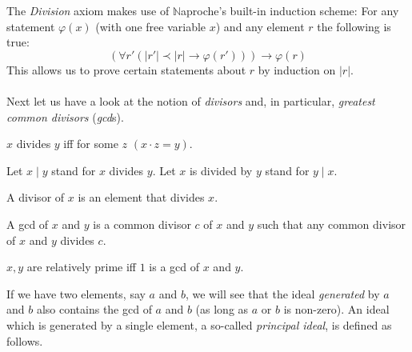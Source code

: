 \documentclass{article}
\begin{document}
  The \textit{Division} axiom makes use of {$\mathbb{N}$aproche's} built-in induction scheme: For any statement $\varphi(x)$ (with one free variable $x$) and any element $r$ the following is true:
  $$ (\forall r' (|r'| \prec |r| \rightarrow \varphi(r'))) \rightarrow \varphi(r)$$
  This allows us to prove certain statements about $r$ by induction on $|r|$.

  \paragraph{} Next let us have a look at the notion of \textit{divisors} and, in particular, \textit{greatest common divisors} (\textit{gcd}s).

  \begin{forthel}

    \begin{definition}[DefDiv]
      $x$ divides $y$ iff for some $z$ $(x \cdot z = y)$.
    \end{definition}

    Let $x \mid y$ stand for $x$ divides $y$.
    Let $x$ is divided by $y$ stand for $y \mid x$.

    \begin{definition}[DefDvs]
      A divisor of $x$ is an element that divides $x$.
    \end{definition}

    \begin{definition}[DefGCD]
      A gcd of $x$ and $y$ is a common divisor $c$ of $x$ and $y$ such that any common divisor of $x$ and $y$ divides $c$.
    \end{definition}

    \begin{definition}[DefRel]
      $x,y$ are relatively prime iff $1$ is a gcd of $x$ and $y$.
    \end{definition}
  \end{forthel}

  If we have two elements, say $a$ and $b$, we will see that the ideal \textit{generated} by $a$ and $b$ also contains the gcd of $a$ and $b$ (as long as $a$ or $b$ is non-zero). An ideal which is generated by a single element, a so-called \textit{principal ideal}, is defined as follows.
\end{document}
